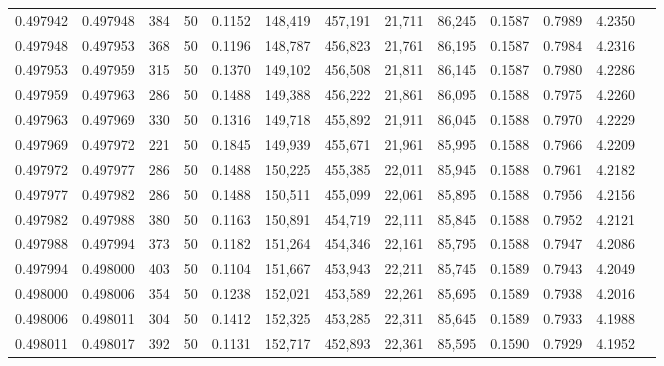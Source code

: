 \begin{tabular}{rrrrrrrrrrrrr}
0.497942 & 0.497948 & 384 &  50 &                                     0.1152 & 148,419 & 457,191 &  21,711 &  86,245 & 0.1587 & 0.7989 & 4.2350 \\
0.497948 & 0.497953 & 368 &  50 &                                     0.1196 & 148,787 & 456,823 &  21,761 &  86,195 & 0.1587 & 0.7984 & 4.2316 \\
0.497953 & 0.497959 & 315 &  50 &                                     0.1370 & 149,102 & 456,508 &  21,811 &  86,145 & 0.1587 & 0.7980 & 4.2286 \\
0.497959 & 0.497963 & 286 &  50 &                                     0.1488 & 149,388 & 456,222 &  21,861 &  86,095 & 0.1588 & 0.7975 & 4.2260 \\
0.497963 & 0.497969 & 330 &  50 &                                     0.1316 & 149,718 & 455,892 &  21,911 &  86,045 & 0.1588 & 0.7970 & 4.2229 \\
0.497969 & 0.497972 & 221 &  50 &                                     0.1845 & 149,939 & 455,671 &  21,961 &  85,995 & 0.1588 & 0.7966 & 4.2209 \\
0.497972 & 0.497977 & 286 &  50 &                                     0.1488 & 150,225 & 455,385 &  22,011 &  85,945 & 0.1588 & 0.7961 & 4.2182 \\
0.497977 & 0.497982 & 286 &  50 &                                     0.1488 & 150,511 & 455,099 &  22,061 &  85,895 & 0.1588 & 0.7956 & 4.2156 \\
0.497982 & 0.497988 & 380 &  50 &                                     0.1163 & 150,891 & 454,719 &  22,111 &  85,845 & 0.1588 & 0.7952 & 4.2121 \\
0.497988 & 0.497994 & 373 &  50 &                                     0.1182 & 151,264 & 454,346 &  22,161 &  85,795 & 0.1588 & 0.7947 & 4.2086 \\
0.497994 & 0.498000 & 403 &  50 &                                     0.1104 & 151,667 & 453,943 &  22,211 &  85,745 & 0.1589 & 0.7943 & 4.2049 \\
0.498000 & 0.498006 & 354 &  50 &                                     0.1238 & 152,021 & 453,589 &  22,261 &  85,695 & 0.1589 & 0.7938 & 4.2016 \\
0.498006 & 0.498011 & 304 &  50 &                                     0.1412 & 152,325 & 453,285 &  22,311 &  85,645 & 0.1589 & 0.7933 & 4.1988 \\
0.498011 & 0.498017 & 392 &  50 &                                     0.1131 & 152,717 & 452,893 &  22,361 &  85,595 & 0.1590 & 0.7929 & 4.1952 \\

\end{tabular}

